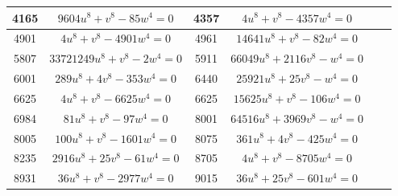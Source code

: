 \documentclass[a4paper,12pt,english,reqno]{amsart}
\begin{document}
\begin{table}
\begin{center}
\begin{tabular}{|c|c||c|c|c|c|}
4165 & $9604 u^8 + v^8 - 85  w^4=0$ &
 4357 & $4 u^8 + v^8 - 4357  w^4=0$ \\\hline
 4901 & $4u^8+v^8-4901 w^4=0$ &
 4961 & $14641u^8+v^8-82 w^4=0$   \\\hline
 5807& $33721249 u^8+v^8 -2  w^4=0 $ &
 5911 & $66049 u^8 + 2116 v^8 -  w^4=0$ \\\hline
 6001 & $289 u^8+4 v^8-353  w^4=0$ &
 6440 & $25921 u^8 + 25 v^8 -  w^4=0$ \\\hline
 6625 & $4 u^8 + v^8 - 6625  w^4=0$ &
 6625 & $15625 u^8 + v^8 - 106  w^4=0$ \\\hline
 6984 & $81 u^8 + v^8 - 97  w^4=0$ &
 8001 & $64516 u^8 + 3969 v^8 -  w^4=0$  \\\hline
 8005 & $100 u^8 + v^8 - 1601  w^4=0$  &
8075 & $361 u^8 + 4 v^8 - 425  w^4=0$ \\\hline
 8235 & $2916u^8+25v^8-61 w^4=0$ &
 8705 & $4u^8+v^8-8705 w^4=0$ \\\hline
 8931 & $36u^8+v^8-2977 w^4=0$  &
 9015 & $36u^8+25v^8-601 w^4=0$ \\\hline
 

\end{tabular}
\end{center}
\end{table}
\end{document}
